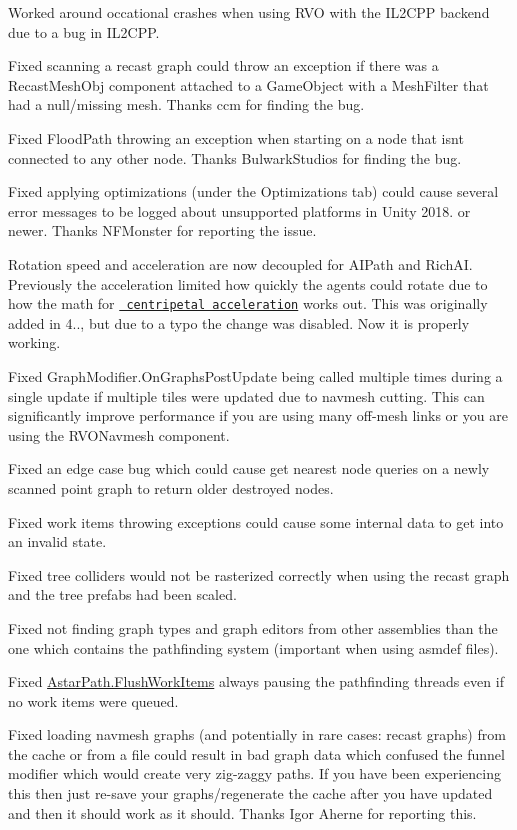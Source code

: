 \begin{DoxyItemize}
\begin{DoxyItemize}
\begin{DoxyItemize}
\item Worked around occational crashes when using R\+VO with the I\+L2\+C\+PP backend due to a bug in I\+L2\+C\+PP.
\item Fixed scanning a recast graph could throw an exception if there was a Recast\+Mesh\+Obj component attached to a Game\+Object with a Mesh\+Filter that had a null/missing mesh. Thanks ccm for finding the bug.
\item Fixed Flood\+Path throwing an exception when starting on a node that isn\textquotesingle{}t connected to any other node. Thanks Bulwark\+Studios for finding the bug.
\item Fixed applying optimizations (under the Optimizations tab) could cause several error messages to be logged about unsupported platforms in Unity 2018. or newer. Thanks N\+F\+Monster for reporting the issue.
\item Rotation speed and acceleration are now decoupled for A\+I\+Path and Rich\+AI. Previously the acceleration limited how quickly the agents could rotate due to how the math for \href{https://en.wikipedia.org/wiki/Centripetal_force}{\texttt{ centripetal acceleration}} works out. This was originally added in 4.., but due to a typo the change was disabled. Now it is properly working.
\item Fixed Graph\+Modifier.\+On\+Graphs\+Post\+Update being called multiple times during a single update if multiple tiles were updated due to navmesh cutting. This can significantly improve performance if you are using many off-\/mesh links or you are using the R\+V\+O\+Navmesh component.
\item Fixed an edge case bug which could cause get nearest node queries on a newly scanned point graph to return older destroyed nodes.
\item Fixed work items throwing exceptions could cause some internal data to get into an invalid state.
\item Fixed tree colliders would not be rasterized correctly when using the recast graph and the tree prefabs had been scaled.
\item Fixed not finding graph types and graph editors from other assemblies than the one which contains the pathfinding system (important when using asmdef files).
\item Fixed \mbox{\hyperlink{class_astar_path_a021f7aac9a2d2f76d4be29eea0c7c32e}{Astar\+Path.\+Flush\+Work\+Items}} always pausing the pathfinding threads even if no work items were queued.
\item Fixed loading navmesh graphs (and potentially in rare cases\+: recast graphs) from the cache or from a file could result in bad graph data which confused the funnel modifier which would create very zig-\/zaggy paths. If you have been experiencing this then just re-\/save your graphs/regenerate the cache after you have updated and then it should work as it should. Thanks Igor Aherne for reporting this.

\end{DoxyItemize}
\end{DoxyItemize}
\end{DoxyItemize}
